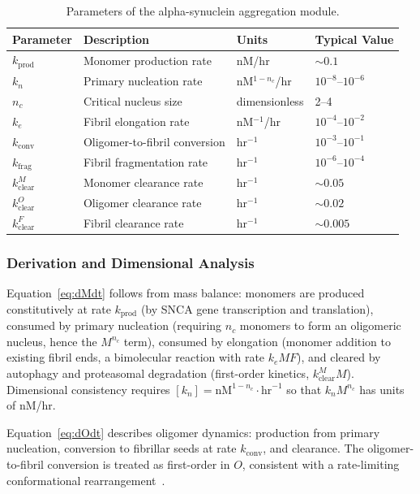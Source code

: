 \begin{table}[h]
\centering
\caption{Parameters of the alpha-synuclein aggregation module.}
\label{tab:agg-params}
\small
\begin{tabular}{llll}
\toprule
\textbf{Parameter} & \textbf{Description} & \textbf{Units} & \textbf{Typical Value} \\
\midrule
$k_\text{prod}$ & Monomer production rate & nM/hr & $\sim 0.1$ \\
$k_n$ & Primary nucleation rate & nM$^{1-n_c}$/hr & $10^{-8}$--$10^{-6}$ \\
$n_c$ & Critical nucleus size & dimensionless & 2--4 \\
$k_e$ & Fibril elongation rate & nM$^{-1}$/hr & $10^{-4}$--$10^{-2}$ \\
$k_\text{conv}$ & Oligomer-to-fibril conversion & hr$^{-1}$ & $10^{-3}$--$10^{-1}$ \\
$k_\text{frag}$ & Fibril fragmentation rate & hr$^{-1}$ & $10^{-6}$--$10^{-4}$ \\
$k_\text{clear}^M$ & Monomer clearance rate & hr$^{-1}$ & $\sim 0.05$ \\
$k_\text{clear}^O$ & Oligomer clearance rate & hr$^{-1}$ & $\sim 0.02$ \\
$k_\text{clear}^F$ & Fibril clearance rate & hr$^{-1}$ & $\sim 0.005$ \\
\bottomrule
\end{tabular}
\end{table}

\subsubsection{Derivation and Dimensional Analysis}

Equation~\eqref{eq:dMdt} follows from mass balance: monomers are produced constitutively at rate $k_\text{prod}$ (by SNCA gene transcription and translation), consumed by primary nucleation (requiring $n_c$ monomers to form an oligomeric nucleus, hence the $M^{n_c}$ term), consumed by elongation (monomer addition to existing fibril ends, a bimolecular reaction with rate $k_e M F$), and cleared by autophagy and proteasomal degradation (first-order kinetics, $k_\text{clear}^M M$). Dimensional consistency requires $[k_n] = \text{nM}^{1-n_c} \cdot \text{hr}^{-1}$ so that $k_n M^{n_c}$ has units of nM/hr.

Equation~\eqref{eq:dOdt} describes oligomer dynamics: production from primary nucleation, conversion to fibrillar seeds at rate $k_\text{conv}$, and clearance. The oligomer-to-fibril conversion is treated as first-order in $O$, consistent with a rate-limiting conformational rearrangement~\cite{dear2020}.

